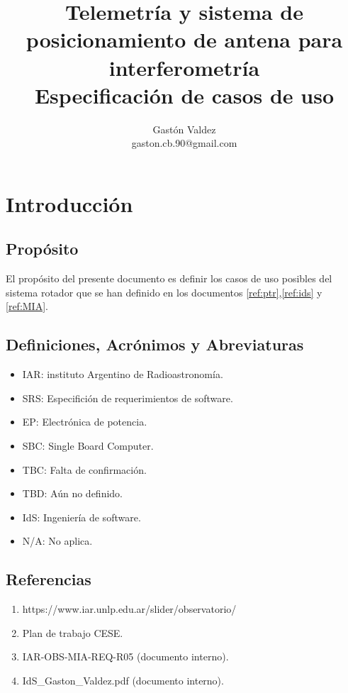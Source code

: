 \documentclass[12pt,a4paper, twosite]{article}
\date{}
\author{Gastón Valdez \\ gaston.cb.90@gmail.com}
\title{Telemetría y sistema de posicionamiento de antena para interferometría \\ Especificación de casos de uso}
\begin{document}
	\begin{titlepage}
		\maketitle
	\end{titlepage}
\tableofcontents
	
	\newpage
	
	\section{Introducción}
	\label{sec:org60390fa}
	\subsection{Propósito}
	\label{sec:org434c3ef}
	El propósito del presente documento es definir los casos de uso posibles del sistema rotador que se han definido en los documentos \ref{ref:ptr},\ref{ref:ids} y \ref{ref:MIA}. 	
	
	\subsection{Definiciones, Acrónimos y Abreviaturas}
	\label{sec:orgb158e36}
	\begin{itemize}
	\item IAR: instituto Argentino de Radioastronomía.  
	\item SRS: Especifición de requerimientos de software.  
	\item EP: Electrónica de potencia.
	\item SBC: Single Board Computer.
	\item TBC: Falta de confirmación.
	\item TBD: Aún no definido.
	\item IdS: Ingeniería de software.
	\item N/A: No aplica.  
	\end{itemize}


	
	
	\subsection{Referencias}
	\label{sec:org62711e0}
	
\begin{enumerate}
	\item \label{ref:MIA}https://www.iar.unlp.edu.ar/slider/observatorio/
	\item \label{ref:cese} Plan de trabajo CESE.
	\item \label{ref:ptr} IAR-OBS-MIA-REQ-R05 (documento interno).
	\item \label{ref:ids} IdS\_Gaston\_Valdez.pdf (documento interno).

\end{enumerate}
	
\end{document}
